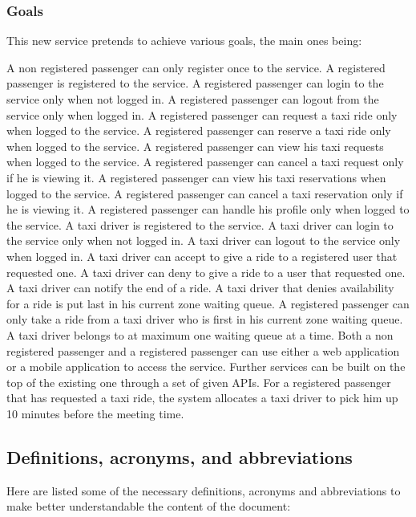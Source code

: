 \subsubsection{Goals}
This new service pretends to achieve various goals, the main ones being:
\begin{itemize}
	 A non registered passenger can only register once to the service.
	 A registered passenger is registered to the service.
	 A registered passenger can login to the service only when not logged in.
	 A registered passenger can logout from the service only when logged in.
	 A registered passenger can request a taxi ride only when logged to the service.
	 A registered passenger can reserve a taxi ride only when logged to the service.
	 A registered passenger can view his taxi requests when logged to the service.
	 A registered passenger can cancel a taxi request only if he is viewing it.
	 A registered passenger can view his taxi reservations when logged to the service.
	 A registered passenger can cancel a taxi reservation only if he is viewing it.
	 A registered passenger can handle his profile only when logged to the service.
	 A taxi driver is registered to the service.
	 A taxi driver can login to the service only when not logged in.
	 A taxi driver can logout to the service only when logged in.
	 A taxi driver can accept to give a ride to a registered user that requested one.
	 A taxi driver can deny to give a ride to a user that requested one.
	 A taxi driver can notify the end of a ride.
	 A taxi driver that denies availability for a ride is put last in his current zone waiting queue.
	 A registered passenger can only take a ride from a taxi driver who is first in his current zone waiting queue.
	 A taxi driver belongs to at maximum one waiting queue at a time.
	 Both a non registered passenger and a registered passenger can use either a web application or a mobile application to access the service.
	 Further services can be built on the top of the existing one through a set of given APIs.
	 For a registered passenger that has requested a taxi ride, the system allocates a taxi driver to pick him up 10 minutes before the meeting time.
\end{itemize}

\subsection{Definitions, acronyms, and abbreviations}
Here are listed some of the necessary definitions, acronyms and abbreviations to make better understandable the content of the document:

